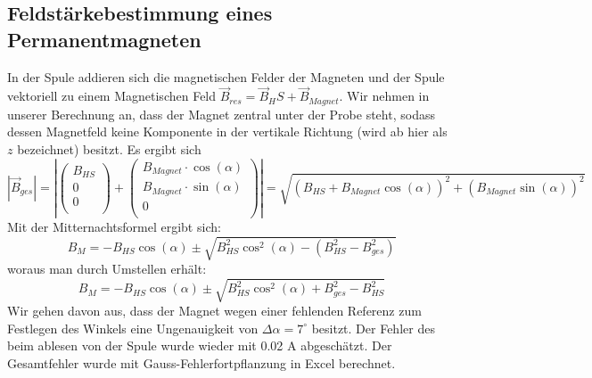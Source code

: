 \documentclass[a4paper,10pt]{scrartcl} %
\begin{document}
\subsection{Feldstärkebestimmung eines Permanentmagneten}
\label{subsec:Auswertung-Feldstaerkebestimmung}
In der Spule addieren sich die magnetischen Felder der Magneten und der Spule vektoriell zu einem Magnetischen Feld $\vec{B}_{res} = \vec{B}_HS + \vec{B}_{Magnet}$. Wir nehmen in unserer Berechnung an, dass der Magnet zentral unter der Probe steht, sodass dessen Magnetfeld keine Komponente in der vertikale Richtung (wird ab hier als $z$ bezeichnet) besitzt. Es ergibt sich
\begin{equation}
|\vec{B}_{ges}| = | \left( \begin{array}{c}
B_{HS}\\
0\\
0\\
\end{array} \right) + \left( \begin{array}{c}
B_{Magnet} \cdot \cos (\alpha)\\
B_{Magnet} \cdot \sin (\alpha)\\
0\\
\end{array} \right)
| = \sqrt{(B_{HS}+ B_{Magnet}\cos(\alpha))^2 + (B_{Magnet}\sin(\alpha))^2}
\end{equation}
Mit der Mitternachtsformel ergibt sich:
\begin{equation}
\label{eqn:Mitternachtsformel}
B_M = -B_{HS}\cos (\alpha) \pm \sqrt{B_{HS}^2 \cos ^2(\alpha) - (B_{HS}^2 - B_{ges}^2)}
\end{equation}
woraus man durch Umstellen erhält:
\begin{equation}
\label{eqn:Auswertung2}
B_M = -B_{HS} \cos (\alpha) \pm \sqrt{B^2_{HS} \cos ^2 (\alpha) + B^2_{ges} - B^2_{HS}}
\end{equation}
Wir gehen davon aus, dass der Magnet wegen einer fehlenden Referenz zum Festlegen des Winkels eine Ungenauigkeit von $\Delta \alpha = 7^\circ$ besitzt. Der Fehler des beim ablesen von der Spule wurde wieder mit 0.02 A abgeschätzt. Der Gesamtfehler wurde mit Gauss-Fehlerfortpflanzung in Excel berechnet.

\newpage
\end{document}
